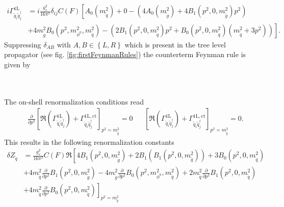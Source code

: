 \begin{align}
i\Gamma^{\mathrm{1L}}_{\tilde{q}_{i}\tilde{q}^\dagger_j} &= i \frac{g_s^2}{16\pi^2}\delta_{ij}C(F) \left[  A_0(m_{\tilde{q}}^2) + 0 - \left( 4A_0(m_{\tilde{g}}^2) + 4B_1(p^2,0,m_{\tilde{g}}^2)p^2 \right) \right.\nonumber\\
& \left.+ 4m_{\tilde{g}}^2B_0(p^2,m_{\phi^0}^2,m_{\tilde{q}}^2) - \left(2B_1(p^2,0,m_{\tilde{q}}^2)p^2 + B_0(p^2,0,m_{\tilde{q}}^2)(m_{\tilde{q}}^2+3p^2) \right) \right].
\end{align}
Suppressing $\delta_{AB}$ with $A,B \in \left\{ L,R \right\}$ which is present in the tree level propagator (see fig. \ref{fig:firstFeynmanRules}) the counterterm Feynman rule is given by\\
\\
\\
The on-shell renormalization conditions read
\begin{align}
&\frac{\partial}{\partial p^2} \left[ \Re (\Gamma^{\mathrm{1L}}_{\tilde{q}_{i}\tilde{q}^\dagger_j}) + \Gamma^{\mathrm{1L,ct}}_{\tilde{q}_{i}\tilde{q}^\dagger_j}  \right]_{p^2 = m_{\tilde{q}}^2} = 0 && \left[ \Re (\Gamma^{\mathrm{1L}}_{\tilde{q}_{i}\tilde{q}^\dagger_j}) + \Gamma^{\mathrm{1L,ct}}_{\tilde{q}_{i}\tilde{q}^\dagger_j}  \right]_{p^2 = m_{\tilde{q}}^2} = 0.
\end{align}
This results in the following renormalization constants
\begin{align}
\delta Z_{\tilde{q}} &= \frac{g_s^2}{16\pi^2}C(F) \Re \left[ 4B_1(p^2,0,m_{\tilde{g}}^2) + 2B_1(B_1(p^2,0,m_{\tilde{q}}^2)) + 3B_0(p^2,0,m_{\tilde{q}}^2) \right.\nonumber\\
& + 4m_{\tilde{q}}^2 \frac{\partial}{\partial p^2}B_1(p^2,0,m_{\tilde{g}}^2) - 4m_{\tilde{g}}^2\frac{\partial}{\partial p^2}B_0(p^2,m_{\phi^0}^2,m_{\tilde{q}}^2) + 2m_{\tilde{q}}^2 \frac{\partial}{\partial p^2}B_1(p^2,0,m_{\tilde{q}}^2)\nonumber\\
& \left. + 4m_{\tilde{q}}^2 \frac{\partial}{\partial p^2}B_0(p^2,0,m_{\tilde{q}}^2)\right]_{p^2 = m_{\tilde{q}}^2}
\end{align}

